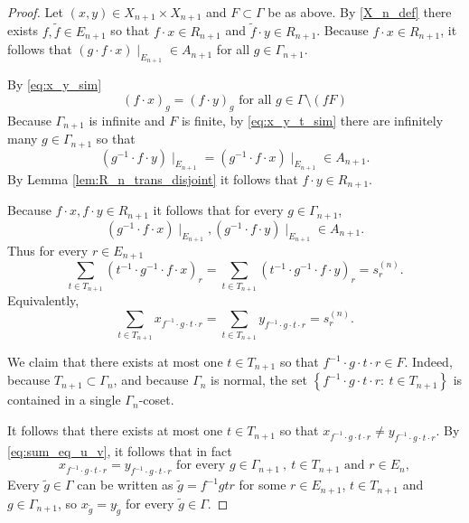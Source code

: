 \documentclass[oneside,english]{amsart}
\theoremstyle{definition}
\begin{document}
\begin{proof}
Let $(x,y) \in   X_{n+1} \times X_{n+1}$ and $F \subset \Gamma$ be as above. By \eqref{X_n_def} there exists $f,\tilde f \in E_{n+1}$ so that  $f \cdot x \in  R_{n+1} $ and $\tilde f \cdot y \in  R_{n+1} $.
Because $f \cdot x \in R_{n+1}$, it follows that
$(g\cdot f \cdot x)\mid_{E_{n+1}} \in A_{n+1}$ for all $g \in \Gamma_{n+1}$.


By \eqref{eq:x_y_sim}
\begin{equation}\label{eq:x_y_t_sim}
( f \cdot x)_g=(f\cdot y )_g \mbox{ for all  } g \in \Gamma \setminus (f F)
\end{equation}
Because $\Gamma_{n+1}$ is infinite and $F$ is finite, %
by \eqref{eq:x_y_t_sim} there are infinitely many $g \in \Gamma_{n+1}$ so that %
$$ (g^{-1} \cdot f \cdot y)\mid_{E_{n+1}} = (g^{-1} \cdot f \cdot x)\mid_{E_{n+1}} \in A_{n+1}.$$
By Lemma \ref{lem:R_n_trans_disjoint} it follows that %
$f \cdot y\in  R_{n+1}$.

Because $f \cdot x,f \cdot y \in R_{n+1}$ it follows that for every $g \in \Gamma_{n+1}$,
 $$(g^{-1} \cdot f \cdot x)\mid_{E_{n+1}},(g^{-1} \cdot f \cdot y)\mid_{E_{n+1}} \in A_{n+1}.$$
Thus for every $r \in E_{n+1}$
\begin{equation}\label{eq:sum_eq_u_v}
 \sum_{t \in T_{n+1}} (t^{-1} \cdot g^{-1} \cdot f \cdot x)_r =\sum_{ t \in T_{n+1}}  (t^{-1} \cdot g^{-1} \cdot f \cdot y)_r = s^{(n)}_r.
\end{equation}
Equivalently,
\begin{equation}\label{eq:sum_eq_u_v}
 \sum_{t \in T_{n+1}} x_{f^{-1} \cdot g \cdot t \cdot r} =\sum_{ t \in T_{n+1}}  y_{f^{-1} \cdot g \cdot t \cdot r} = s^{(n)}_r.
\end{equation}



We claim that there exists at most one $t \in T_{n+1}$ so that $f^{-1} \cdot g \cdot t \cdot r \in F$. Indeed, because $T_{n+1} \subset \Gamma_n$, and because $\Gamma_n$ is normal, the set
$\left\{ f^{-1} \cdot g \cdot t \cdot r :~  t \in T_{n+1} \right\}$ is contained in a single $\Gamma_n$-coset.

It follows that there exists at most one $t \in T_{n+1}$ so that   $x_{f^{-1} \cdot g \cdot t \cdot r} \ne y_{f^{-1} \cdot g \cdot t \cdot r}$.
By \eqref{eq:sum_eq_u_v}, it follows that in fact
\begin{equation}\label{eq:u_eq_v}
x_{f^{-1}\cdot g\cdot   t \cdot  r} = y_{f^{-1} \cdot g \cdot t\cdot r} \mbox{ for every } g\in \Gamma_{n+1}~,~ t \in T_{n+1} \mbox{ and } r \in E_{n},
\end{equation}
 Every $\tilde g \in \Gamma$ can be written as $\tilde g = f^{-1} g t r$ for some $r \in E_{n+1}$, $t \in T_{n+1}$ and $g \in \Gamma_{n+1}$,
so $x_{\tilde g} = y_{\tilde g}$ for every $\tilde g \in \Gamma$.
\end{proof}
\end{document}
